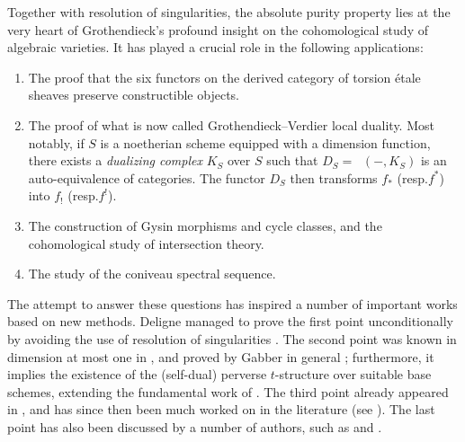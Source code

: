 \documentclass[11pt]{article}
\newcommand{\resp}{resp.\xspace}
\numberwithin{equation}{section}\renewcommand{\encodingdefault}{TU}
\newcommand{\tstructure}{$t$-structure\xspace}
\DeclareMathOperator{\uHom}{\underline{Hom}}
\theoremstyle{remark}
\theoremstyle{definition}
\numberwithin{equation}{thm}
\begin{document}
Together with resolution of singularities, the absolute purity property lies at the very heart of Grothendieck's profound insight on the cohomological study of algebraic varieties. It has played a crucial role in the following applications:
\begin{enumerate}
\item The proof that the six functors on the derived category of torsion étale sheaves preserve constructible objects.

\item The proof of what is now called Grothendieck--Verdier local duality. Most notably, if $S$ is a noetherian scheme equipped with a dimension function, there exists a \emph{dualizing complex} $K_S$ over $S$ such that $D_S=\uHom(-,K_S)$ is an auto-equivalence of categories. The functor $D_S$ then transforms $f_*$ (\resp $f^*$) into $f_!$ (\resp $f^!$).

\item The construction of Gysin morphisms and cycle classes, and the cohomological study of intersection theory.

\item The study of the coniveau spectral sequence.
\end{enumerate}
The attempt to answer these questions has inspired a number of important works based on new methods. Deligne managed to prove the first point unconditionally by avoiding the use of resolution of singularities \cite[Th.\,Finitude]{SGA4.5}. The second point was known in dimension at most one in \cite[Dualité\,1.4]{SGA4.5}, and proved by Gabber in general \cite[XVII]{Gabber}; furthermore, it implies the existence of the (self-dual) perverse \tstructure over suitable base schemes, extending the fundamental work of \cite{BBD}.
The third point already appeared in \cite[XVIII]{SGA4}, and has since then been much worked on in the literature (see \cite{DJK}). The last point has also been discussed by a number of authors, such as \cite{BlochOgus} and \cite{CTHK}.
\end{document}
